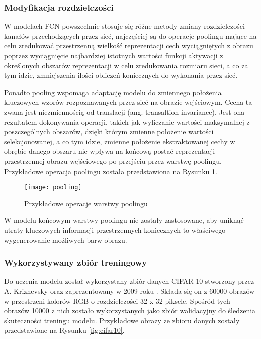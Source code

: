   \subsubsection{Modyfikacja rozdzielczości}

  W modelach FCN powszechnie stosuje się różne metody zmiany rozdzielczości
  kanałów przechodzących przez sieć, najczęściej są do operacje poolingu mające
  na celu zredukować przestrzenną wielkość reprezentacji cech wyciągniętych z
  obrazu poprzez wyciągnięcie najbardziej istotnych wartości funkcji aktywacji z
  określonych obszarów reprezentacji w celu zredukowania rozmiaru
  sieci, a co za tym idzie, zmniejszenia ilości obliczeń koniecznych do wykonania
  przez sieć.

  Ponadto pooling wspomaga adaptację modelu do zmiennego położenia
  kluczowych wzorów rozpoznawanych przez sieć na obrazie wejściowym. Cecha ta
  zwana jest niezmiennością od translacji (ang. transaltion invariance). Jest
  ona rezultatem dokonywania operacji, takich jak wyliczanie wartości maksymalnej
  z poszczególnych obszarów, dzięki którym zmienne położenie wartości
  selekcjonowanej, a co tym idzie, zmienne położenie ekstraktowanej cechy w obrębie
  danego obszaru nie wpływa na końcową postać reprezentacji przestrzennej obrazu
  wejściowego po przejściu przez warstwę poolingu. Przykładowe operacja poolingu
  została przedstawiona na Rysunku \ref{fig:pooling}.

  \begin{figure}[h]
   \centering
   \texttt{[image: pooling]}
   \caption[Przykładowe operacje warstwy poolingu - źródło: Rysunek własny]{Przykładowe operacje warstwy poolingu}
   \label{fig:pooling}
  \end{figure}

  W modelu końcowym warstwy poolingu nie zostały zastosowane, aby uniknąć utraty
  kluczowych informacji przestrzennych koniecznych to właściwego wygenerowanie
  możliwych barw obrazu.

  \subsubsection{Wykorzystywany zbiór treningowy}

  Do uczenia modelu został wykorzystany zbiór danych CIFAR-10 stworzony przez
  A. Krizhevsky oraz zaprezentowany w 2009 roku \cite{cifar-10}.
  Składa się on z 60000 obrazów w przestrzeni kolorów RGB o rozdzielczości 32 x 32 piksele.
  Spośród tych obrazów 10000 z nich zostało wykorzystanych jako zbiór
  walidacyjny do śledzenia skuteczności treningu modelu. Przykładowe obrazy
  ze zbioru danych zostały przedstawione na Rysunku \ref{fig:cifar10}.

